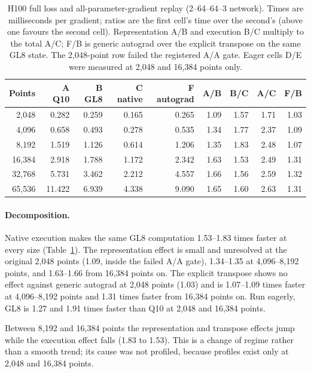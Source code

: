 \documentclass[11pt]{article}
\begin{document}
\begin{table}[htbp]\centering\small
\setlength{\tabcolsep}{4pt}
\caption{H100 full loss and all-parameter-gradient replay (2--64--64--3 network). Times are milliseconds per gradient; ratios are the first cell's time over the second's (above one favours the second cell). Representation A/B and execution B/C multiply to the total A/C; F/B is generic autograd over the explicit transpose on the same GL8 state. The 2,048-point row failed the registered A/A gate. Eager cells D/E were measured at 2,048 and 16,384 points only.}
\label{tab:ablation}
\begin{tabular}{rrrrrrrrr}\toprule
Points & A Q10 & B GL8 & C native & F autograd & A/B & B/C & A/C & F/B\\\midrule
2,048 & 0.282 & 0.259 & 0.165 & 0.265 & 1.09 & 1.57 & 1.71 & 1.03\\
4,096 & 0.658 & 0.493 & 0.278 & 0.535 & 1.34 & 1.77 & 2.37 & 1.09\\
8,192 & 1.519 & 1.126 & 0.614 & 1.206 & 1.35 & 1.83 & 2.48 & 1.07\\
16,384 & 2.918 & 1.788 & 1.172 & 2.342 & 1.63 & 1.53 & 2.49 & 1.31\\
32,768 & 5.731 & 3.462 & 2.212 & 4.557 & 1.66 & 1.56 & 2.59 & 1.32\\
65,536 & 11.422 & 6.939 & 4.338 & 9.090 & 1.65 & 1.60 & 2.63 & 1.31
\\\bottomrule\end{tabular}
\end{table}

\paragraph{Decomposition.}
Native execution makes the same GL8 computation 1.53--1.83 times faster at
every size (Table~\ref{tab:ablation}). The representation effect is small
and unresolved at the original 2,048 points (1.09, inside the failed A/A
gate), 1.34--1.35 at 4,096--8,192 points, and 1.63--1.66 from 16,384 points
on. The explicit transpose shows no effect against generic autograd at
2,048 points (1.03) and is 1.07--1.09 times faster at 4,096--8,192 points
and 1.31 times faster from 16,384 points on. Run eagerly, GL8 is 1.27 and
1.91 times faster than Q10 at 2,048 and 16,384 points.

Between 8,192 and 16,384 points the representation and transpose effects
jump while the execution effect falls (1.83 to 1.53). This is a change of
regime rather than a smooth trend; its cause was not profiled, because
profiles exist only at 2,048 and 16,384 points.
\end{document}
